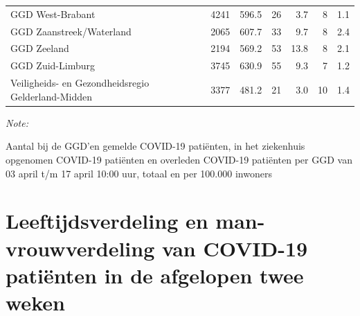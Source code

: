 \documentclass[
  english,
  man,floatsintext]{apa6}
\begin{document}
\begin{table}
\begin{threeparttable}
\begin{tabular}{lrrrrrr}
GGD West-Brabant & 4241 & 596.5 & 26 & 3.7 & 8 & 1.1\\
GGD Zaanstreek/Waterland & 2065 & 607.7 & 33 & 9.7 & 8 & 2.4\\
GGD Zeeland & 2194 & 569.2 & 53 & 13.8 & 8 & 2.1\\
GGD Zuid-Limburg & 3745 & 630.9 & 55 & 9.3 & 7 & 1.2\\
Veiligheids- en Gezondheidsregio Gelderland-Midden & 3377 & 481.2 & 21 & 3.0 & 10 & 1.4\\
\bottomrule
\end{tabular}
\begin{tablenotes}
\item \textit{Note: } 
\item Aantal bij de GGD’en gemelde COVID-19 patiënten, in het ziekenhuis opgenomen COVID-19 patiënten en overleden COVID-19 patiënten per GGD van 03 april t/m 17 april 10:00 uur, totaal en per 100.000 inwoners
\end{tablenotes}
\end{threeparttable}
\endgroup{}
\end{table}

\newpage

\hypertarget{leeftijdsverdeling-en-man-vrouwverdeling-van-covid-19-patiuxebnten-in-de-afgelopen-twee-weken}{%
\section{Leeftijdsverdeling en man-vrouwverdeling van COVID-19 patiënten in de afgelopen twee weken}\label{leeftijdsverdeling-en-man-vrouwverdeling-van-covid-19-patiuxebnten-in-de-afgelopen-twee-weken}}
\end{document}
